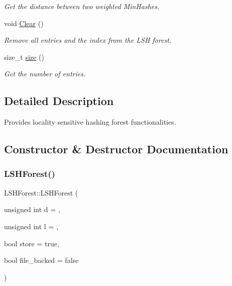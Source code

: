 \begin{DoxyCompactItemize}
\begin{DoxyCompactList}\small\item\em Get the distance between two weighted Min\+Hashes. \end{DoxyCompactList}\item 
\mbox{\label{classLSHForest_aec34dc5185166dce9c22a4060ce3914c}} 
void \hyperlink{classLSHForest_aec34dc5185166dce9c22a4060ce3914c}{Clear} ()
\begin{DoxyCompactList}\small\item\em Remove all entries and the index from the L\+SH forest. \end{DoxyCompactList}\item 
size\+\_\+t \hyperlink{classLSHForest_af0015fae65afd25bf67875d12dc0d663}{size} ()
\begin{DoxyCompactList}\small\item\em Get the number of entries. \end{DoxyCompactList}\end{DoxyCompactItemize}


\subsection{Detailed Description}
Provides locality sensitive hashing forest functionalities. 

\subsection{Constructor \& Destructor Documentation}
\mbox{\label{classLSHForest_ae227bb302c173481a129335fa581fa6f}} 
\subsubsection{\texorpdfstring{L\+S\+H\+Forest()}{LSHForest()}}
{\footnotesize\ttfamily L\+S\+H\+Forest\+::\+L\+S\+H\+Forest (\begin{DoxyParamCaption}\item[{unsigned int}]{d = {},  }\item[{unsigned int}]{l = {},  }\item[{bool}]{store = {\ttfamily true},  }\item[{bool}]{file\+\_\+backed = {\ttfamily false} }\end{DoxyParamCaption})}



